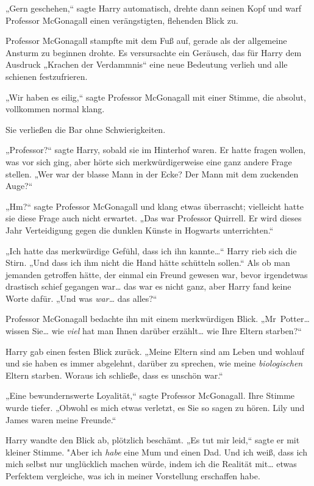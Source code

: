 {„Gern geschehen,“ sagte Harry automatisch, drehte dann seinen Kopf und warf Professor McGonagall einen verängstigten, flehenden Blick zu.

Professor McGonagall stampfte mit dem Fuß auf, gerade als der allgemeine Ansturm zu beginnen drohte. Es versursachte ein Geräusch, das für Harry dem Ausdruck „Krachen der Verdammnis“ eine neue Bedeutung verlieh und alle schienen festzufrieren.

„Wir haben es eilig,“ sagte Professor McGonagall mit einer Stimme, die absolut, vollkommen normal klang.

Sie verließen die Bar ohne Schwierigkeiten.

„Professor?“ sagte Harry, sobald sie im Hinterhof waren. Er hatte fragen wollen, was vor sich ging, aber hörte sich merkwürdigerweise eine ganz andere Frage stellen. „Wer war der blasse Mann in der Ecke? Der Mann mit dem zuckenden Auge?“

„Hm?“ sagte Professor McGonagall und klang etwas überrascht; vielleicht hatte sie diese Frage auch nicht erwartet. „Das war Professor Quirrell. Er wird dieses Jahr Verteidigung gegen die dunklen Künste in Hogwarts unterrichten.“

„Ich hatte das merkwürdige Gefühl, dass ich ihn kannte…“ Harry rieb sich die Stirn. „Und dass ich ihm nicht die Hand hätte schütteln sollen.“ Als ob man jemanden getroffen hätte, der einmal ein Freund gewesen war, bevor irgendetwas drastisch schief gegangen war… das war es nicht ganz, aber Harry fand keine Worte dafür. „Und was \emph{war…} das alles?“

Professor McGonagall bedachte ihn mit einem merkwürdigen Blick. „Mr~Potter… wissen Sie… wie \emph{viel} hat man Ihnen darüber erzählt… wie Ihre Eltern starben?“

Harry gab einen festen Blick zurück. „Meine Eltern sind am Leben und wohlauf und sie haben es immer abgelehnt, darüber zu sprechen, wie meine \emph{biologischen} Eltern starben. Woraus ich schließe, dass es unschön war.“

„Eine bewundernswerte Loyalität,“ sagte Professor McGonagall. Ihre Stimme wurde tiefer. „Obwohl es mich etwas verletzt, es Sie so sagen zu hören. Lily und James waren meine Freunde.“

Harry wandte den Blick ab, plötzlich beschämt. „Es tut mir leid,“ sagte er mit kleiner Stimme. "Aber ich \emph{habe} eine Mum und einen Dad. Und ich weiß, dass ich mich selbst nur unglücklich machen würde, indem ich die Realität mit… etwas Perfektem vergleiche, was ich in meiner Vorstellung erschaffen habe.

}
